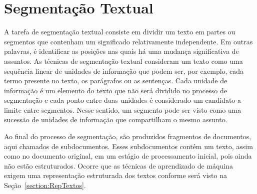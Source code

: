 
\section{Segmentação Textual}


A tarefa de segmentação textual consiste em dividir um texto em partes ou segmentos que contenham um significado relativamente independente. Em outras palavras, é identificar as posições nas quais há uma mudança significativa de assuntos. As técnicas de segmentação textual consideram um texto como uma sequência linear de unidades de informação que podem ser, por exemplo, cada termo presente no texto, os parágrafos ou as sentenças. Cada unidade de informação é um elemento do texto que não será dividido no processo de segmentação e cada ponto entre duas unidades é considerado um candidato a limite entre segmentos. Nesse sentido, um segmento pode ser visto como uma sucessão de unidades de informação que compartilham o mesmo assunto.










Ao final do processo de segmentação, são produzidos fragmentos de documentos, aqui chamados de subdocumentos. Esses subdocumentos contém um texto, assim como no documento original, em um estágio de processamento inicial, pois ainda não estão estruturados. Ocorre que as técnicas de aprendizado de máquina exigem uma representação estruturada dos textos conforme será visto na Seção~\ref{section:RepTextos}.








